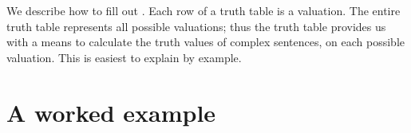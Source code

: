 We describe how to fill out .
Each row of a truth table is a valuation. The entire truth table represents all possible valuations; thus the truth table provides us with a means to calculate the truth values of complex sentences, on each possible valuation. This is easiest to explain by example.

\section{A worked example}




